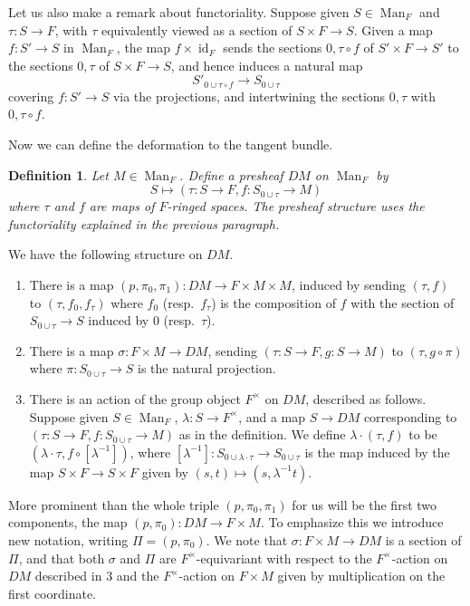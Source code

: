 \documentclass[12pt]{article}
\newtheorem{definition}[theorem]{Definition}
\begin{document}
Let us also make a remark about functoriality.  Suppose given $S\in\operatorname{Man}_F$ and $\tau:S\rightarrow F$, with $\tau$ equivalently viewed as a section of $S\times F\rightarrow S$.  Given a map $f:S'\rightarrow S$ in $\operatorname{Man}_F$, the map $f\times \operatorname{id}_F$ sends the sections $0,\tau\circ f$ of $S'\times F\rightarrow S'$ to the sections $0,\tau$ of $S\times F\rightarrow S$, and hence induces a natural map
$$S'_{0\cup \tau\circ f}\rightarrow S_{0\cup \tau}$$
covering $f:S'\rightarrow S$ via the projections, and intertwining the sections $0,\tau$ with $0,\tau\circ f$.

Now we can define the deformation to the tangent bundle.

\begin{definition}\label{defstructure}
Let $M\in\operatorname{Man}_F$.  Define a presheaf $DM$ on $\operatorname{Man}_F$ by
$$S\mapsto (\tau:S\rightarrow F, f:S_{0\cup \tau}\rightarrow M)$$
where $\tau$ and $f$ are maps of $F$-ringed spaces.  The presheaf structure uses the functoriality explained in the previous paragraph.
\end{definition}

We have the following structure on $DM$.

\begin{enumerate}
\item There is a map $(p,\pi_0,\pi_1):DM\rightarrow F\times M\times M$, induced by sending $(\tau,f)$ to $(\tau,f_0, f_\tau)$ where $f_0$ (resp.\ $f_\tau$) is the composition of $f$ with the section of $S_{0\cup \tau}\rightarrow S$ induced by $0$ (resp.\ $\tau$).
\item There is a map $\sigma: F\times M \rightarrow DM$, sending $(\tau:S\rightarrow F,g:S\rightarrow M)$ to $(\tau, g\circ \pi)$ where $\pi:S_{0\cup \tau}\rightarrow S$ is the natural projection.
\item There is an action of the group object $F^\times$ on $DM$, described as follows.  Suppose given $S\in\operatorname{Man}_F$, $\lambda:S\rightarrow F^\times$, and a map $S\rightarrow DM$ corresponding to $(\tau:S\rightarrow F, f:S_{0\cup \tau}\rightarrow M)$ as in the definition.  We define $\lambda\cdot (\tau,f)$ to be $(\lambda\cdot \tau, f\circ [\lambda^{-1}])$, where $[\lambda^{-1}]:S_{0\cup \lambda\cdot\tau}\rightarrow S_{0\cup \tau}$ is the map induced by the map $S\times F\rightarrow S\times F$ given by $(s,t)\mapsto (s,\lambda^{-1}t)$.
\end{enumerate}

More prominent than the whole triple $(p,\pi_0,\pi_1)$ for us will be the first two components, the map $(p,\pi_0):DM\rightarrow F\times M$.  To emphasize this we introduce new notation, writing $\Pi = (p,\pi_0)$.  We note that $\sigma:F\times M\rightarrow DM$ is a section of $\Pi$, and that both $\sigma$ and $\Pi$ are $F^\times$-equivariant with respect to the $F^\times$-action on $DM$ described in 3 and the $F^\times$-action on $F\times M$ given by multiplication on the first coordinate.
\end{document}
